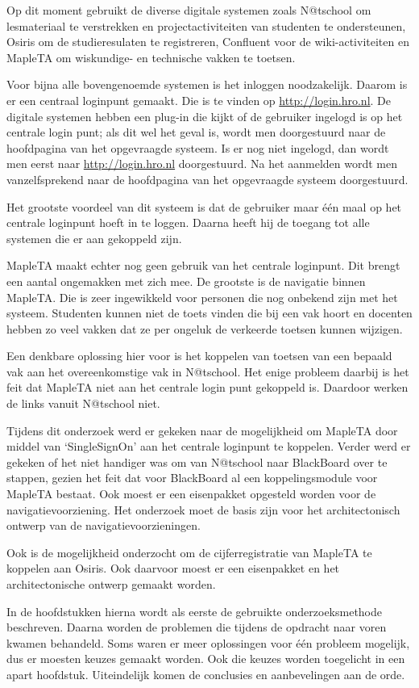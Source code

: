 
Op dit moment gebruikt de \HR{} diverse digitale systemen zoals
N@tschool om lesmateriaal te verstrekken en projectactiviteiten van
studenten te ondersteunen, Osiris om de studieresulaten te
registreren, Confluent voor de wiki-activiteiten en MapleTA om
wiskundige- en technische vakken te toetsen.

Voor bijna alle bovengenoemde systemen is het inloggen
noodzakelijk. Daarom is er een centraal loginpunt gemaakt. Die is te
vinden op \url{http://login.hro.nl}. De digitale systemen hebben een
plug-in die kijkt of de gebruiker ingelogd is op het centrale login
punt; als dit wel het geval is, wordt men doorgestuurd naar de
hoofdpagina van het opgevraagde systeem. Is er nog niet ingelogd, dan
wordt men eerst naar \url{http://login.hro.nl} doorgestuurd. Na het
aanmelden wordt men vanzelfsprekend naar de hoofdpagina van het
opgevraagde systeem doorgestuurd.

Het grootste voordeel van dit systeem is dat de gebruiker maar \'e\'en
maal op het centrale loginpunt hoeft in te loggen. Daarna heeft hij
de toegang tot alle systemen die er aan gekoppeld zijn.

MapleTA maakt echter nog geen gebruik van het centrale loginpunt. Dit
brengt een aantal ongemakken met zich mee. De grootste is de navigatie
binnen MapleTA. Die is zeer ingewikkeld voor personen die nog onbekend
zijn met het systeem. Studenten kunnen niet de toets vinden die bij
een vak hoort en docenten hebben zo veel vakken dat ze per ongeluk de
verkeerde toetsen kunnen wijzigen.

Een denkbare oplossing hier voor is het koppelen van toetsen van een
bepaald vak aan het overeenkomstige vak in N@tschool. Het enige
probleem daarbij is het feit dat MapleTA niet aan het centrale login
punt gekoppeld is. Daardoor werken de links vanuit N@tschool niet.

Tijdens dit onderzoek werd er gekeken naar de mogelijkheid om MapleTA
door middel van `SingleSignOn' aan het centrale loginpunt te
koppelen. Verder werd er gekeken of het niet handiger was om van
N@tschool naar BlackBoard over te stappen, gezien het feit dat voor
BlackBoard al een koppelingsmodule voor MapleTA bestaat. Ook moest er
een eisenpakket opgesteld worden voor de navigatievoorziening. Het
onderzoek moet de basis zijn voor het architectonisch ontwerp van de
navigatievoorzieningen.

Ook is de mogelijkheid onderzocht om de cijferregistratie van MapleTA
te koppelen aan Osiris. Ook daarvoor moest er een eisenpakket en het
architectonische ontwerp gemaakt worden. 

In de hoofdstukken hierna wordt als eerste de gebruikte
onderzoeksmethode beschreven. Daarna worden de problemen die tijdens
de opdracht naar voren kwamen behandeld. Soms waren er meer
oplossingen voor één probleem mogelijk, dus er moesten keuzes gemaakt
worden. Ook die keuzes worden toegelicht in een apart
hoofdstuk. Uiteindelijk komen de conclusies en aanbevelingen aan de
orde.
